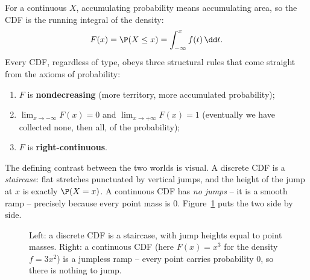 For a continuous $X$, accumulating probability means accumulating area, so the CDF
is the running integral of the density:
\[
  F(x) = \P(X \le x) = \int_{-\infty}^{x} f(t)\,\dd t .
\]
Every CDF, regardless of type, obeys three structural rules that come straight from
the axioms of probability:
\begin{enumerate}
\item $F$ is \textbf{nondecreasing} (more territory, more accumulated probability);
\item $\displaystyle \lim_{x \to -\infty} F(x) = 0$ and
      $\displaystyle \lim_{x \to +\infty} F(x) = 1$ (eventually we have collected
      none, then all, of the probability);
\item $F$ is \textbf{right-continuous}.
\end{enumerate}
The defining contrast between the two worlds is visual. A discrete CDF is a
\emph{staircase}: flat stretches punctuated by vertical jumps, and the height of
the jump at $x$ is exactly $\P(X=x)$. A continuous CDF has \emph{no jumps} -- it is
a smooth ramp -- precisely because every point mass is $0$. Figure~\ref{ch10:fig-cdf}
puts the two side by side.

\begin{figure}[H]
\centering
{}
\caption{Left: a discrete CDF is a staircase, with jump heights equal to point
masses. Right: a continuous CDF (here $F(x)=x^3$ for the density $f=3x^2$) is a
jumpless ramp -- every point carries probability $0$, so there is nothing to jump.}
\label{ch10:fig-cdf}
\end{figure}

